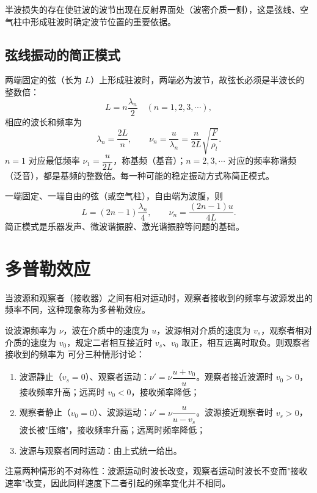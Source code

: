     半波损失的存在使驻波的波节出现在反射界面处（波密介质一侧），这是弦线、空气柱中形成驻波时确定波节位置的重要依据。

    \subsection{弦线振动的简正模式}
    两端固定的弦（长为 $L$）上形成驻波时，两端必为波节，故弦长必须是半波长的整数倍：
    \[
    L=n\frac{\lambda_n}{2}\quad(n=1,2,3,\cdots),
    \]
    相应的波长和频率为
    \[
    \lambda_n=\frac{2L}{n},\qquad
    \nu_n=\frac{u}{\lambda_n}=\frac{n}{2L}\sqrt{\frac{F}{\rho_l}}.
    \]
    $n=1$ 对应最低频率 $\nu_1=\dfrac{u}{2L}$，称基频（基音）；$n=2,3,\cdots$ 对应的频率称谐频（泛音），都是基频的整数倍。每一种可能的稳定振动方式称简正模式。

    一端固定、一端自由的弦（或空气柱），自由端为波腹，则
    \[
    L=(2n-1)\frac{\lambda_n}{4},\qquad
    \nu_n=\frac{(2n-1)u}{4L}.
    \]
    简正模式是乐器发声、微波谐振腔、激光谐振腔等问题的基础。


\section{多普勒效应}
    当波源和观察者（接收器）之间有相对运动时，观察者接收到的频率与波源发出的频率不同，这种现象称为多普勒效应。

    设波源频率为 $\nu$，波在介质中的速度为 $u$，波源相对介质的速度为 $v_s$，观察者相对介质的速度为 $v_0$，规定二者相互接近时 $v_s$、$v_0$ 取正，相互远离时取负。则观察者接收到的频率为
    可分三种情形讨论：
    \begin{enumerate}
        \item 波源静止（$v_s=0$）、观察者运动：$\nu'=\nu\dfrac{u+v_0}{u}$。观察者接近波源时 $v_0>0$，接收频率升高；远离时 $v_0<0$，接收频率降低；
        \item 观察者静止（$v_0=0$）、波源运动：$\nu'=\nu\dfrac{u}{u-v_s}$。波源接近观察者时 $v_s>0$，波长被"压缩"，接收频率升高；远离时频率降低；
        \item 波源与观察者同时运动：由上式统一给出。
    \end{enumerate}
    注意两种情形的不对称性：波源运动时波长改变，观察者运动时波长不变而"接收速率"改变，因此同样速度下二者引起的频率变化并不相同。

